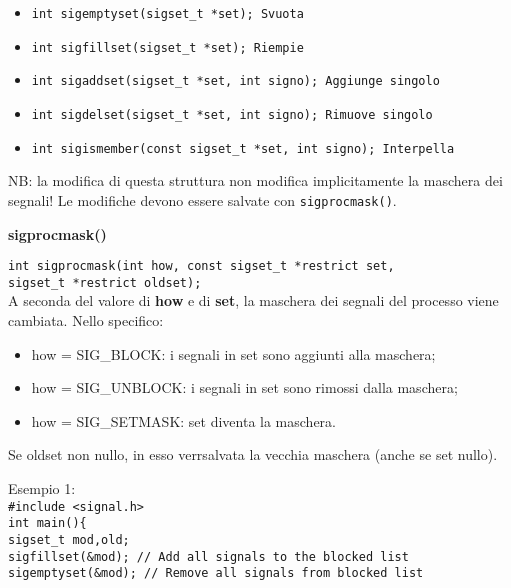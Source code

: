 \begin{flushleft}
\begin{flushleft}
\begin{flushleft}
      \begin{itemize}
        \item \texttt{int sigemptyset(sigset\_t *set); Svuota}
        \item \texttt{int sigfillset(sigset\_t *set); Riempie}
        \item \texttt{int sigaddset(sigset\_t *set, int signo); Aggiunge singolo}
        \item \texttt{int sigdelset(sigset\_t *set, int signo); Rimuove singolo}
        \item \texttt{int sigismember(const sigset\_t *set, int signo); Interpella}
      \end{itemize}
      NB: la modifica di questa struttura non modifica implicitamente la maschera dei 
      segnali! Le modifiche devono essere salvate con \texttt{sigprocmask()}.
    \end{flushleft}
    \begin{flushleft}
      \textbf{sigprocmask()}\par
      \texttt{int sigprocmask(int how, const sigset\_t *restrict set,\\ 
              \tab\tab\tab sigset\_t *restrict oldset);}\\
      A seconda del valore di \textbf{how} e di \textbf{set}, la maschera dei segnali del processo viene 
      cambiata. Nello specifico:
      \begin{itemize}
        \item how = SIG\_BLOCK: i segnali in set sono aggiunti alla maschera;
        \item how = SIG\_UNBLOCK: i segnali in set sono rimossi dalla maschera;
        \item how = SIG\_SETMASK: set diventa la maschera.
      \end{itemize}
      Se oldset non \ace nullo, in esso verr\aca salvata la vecchia maschera 
      (anche se set \ace nullo).\\
      \begin{flushleft}
        Esempio 1: \\
        \texttt{\#include <signal.h> \\
        int main()\{\\
        \halftab sigset\_t mod,old;\\
        \halftab sigfillset(\&mod); // Add all signals to the blocked list\\
        \halftab sigemptyset(\&mod); // Remove all signals from blocked list\\
}
\end{flushleft}
\end{flushleft}
\end{flushleft}
\end{flushleft}
